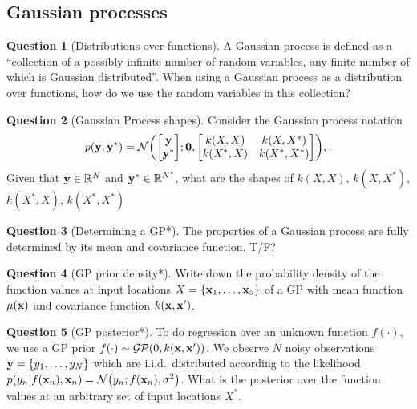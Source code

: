 \documentclass[a4paper]{article}
\theoremstyle{definition}
\newtheorem{question}{Question}
\begin{document}
\subsection{Gaussian processes}
\begin{question}[Distributions over functions]
\label{q:gp-rv}
A Gaussian process is defined as a ``collection of a possibly infinite number of random variables, any finite number of which is Gaussian distributed''. When using a Gaussian process as a distribution over functions, how do we use the random variables in this collection?
\end{question}


\begin{question}[Gaussian Process shapes]
Consider the Gaussian process notation
\begin{align}
p(\vy, \vy^*) = \NormDist{\begin{bmatrix}\vy \\ \vy^*\end{bmatrix}; \mathbf 0, \begin{bmatrix} k(X, X) & k(X, X^*) \\ k(X^*, X) & k(X^*, X^*) \end{bmatrix}} ,.
\end{align}
Given that $\mathbf{y} \in \mathbb{R}^N$ and $\mathbf{y}^* \in \mathbb{R}^{N^*}$, what are the shapes of $k(X, X)$, $k(X, X^*)$, $k(X^*, X)$, $k(X^*, X^*)$
\end{question}


\begin{question}[Determining a GP*]
\label{q:mean-cov-determine-gp}
The properties of a Gaussian process are fully determined by its mean and covariance function. T/F?
\end{question}

\begin{question}[GP prior density*]
\label{q:prior-density}
Write down the probability density of the function values at input locations $X = \{\mathbf{x}_1, \dots, \mathbf{x}_5\}$ of a GP with mean function $\mu(\mathbf{x})$ and covariance function $k(\mathbf{x}, \mathbf{x}')$.
\end{question}

\begin{question}[GP posterior*]
\label{q:posterior}
To do regression over an unknown function $f(\cdot)$, we use a GP prior $f(\cdot) \sim \mathcal{GP}(0, k(\mathbf{x}, \mathbf{x}'))$. We observe $N$ noisy observations $\mathbf{y} = \{y_1, \dots, y_N\}$ which are i.i.d.~distributed according to the likelihood $p(y_n| f(\vx_n), \vx_n) = \NormDist{y_n; f(\vx_n), \sigma^2}$. What is the posterior over the function values at an arbitrary set of input locations $X^*$.
\end{question}
\end{document}
